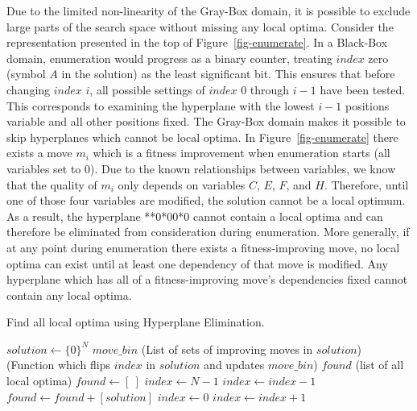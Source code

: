 \documentclass[runningheads,a4paper]{llncs}
\begin{document}
Due to the limited non-linearity of the Gray-Box domain, it is possible to exclude large
parts of the search space without missing any local optima.
Consider the representation presented in the top of Figure~\ref{fig-enumerate}. In a Black-Box
domain, enumeration would progress as a binary counter, treating $index$ zero (symbol $A$ in the solution) as
the least significant bit. This ensures that before changing $index$ $i$, all possible settings of $index$
0 through $i-1$ have been tested. This corresponds to examining the hyperplane with the lowest $i-1$ positions
variable and all other positions fixed. The Gray-Box domain makes it possible to skip hyperplanes
which cannot be local optima. In Figure~\ref{fig-enumerate} there exists a move $m_i$ which is a fitness improvement
when enumeration starts (all variables set to 0). Due to the known relationships between variables,
we know that the quality of $m_i$ only depends on variables $C$, $E$, $F$, and $H$.
Therefore, until one of those four variables are modified, the solution cannot be a local optimum.
As a result, the hyperplane **0*00*0 cannot contain a local optima and can
therefore be eliminated from consideration during enumeration.
More generally, if at any point during enumeration
there exists a fitness-improving move, no local optima can exist until at least one
dependency of that move is modified. Any hyperplane which has all of a fitness-improving
move's dependencies fixed cannot contain any local optima.

\begin{algorithm}
  \caption{Find all local optima using Hyperplane Elimination.}
  \label{alg-enumerate}
  \begin{algorithmic}[1]
    \Require $solution \leftarrow \{0\}^N$
    \Require $move\_bin$ (List of sets of improving moves in $solution$)
    \Require {} (Function which flips $index$ in $solution$ and updates $move\_bin$)
    \Ensure $found$ (list of all local optima)
    \State $found \leftarrow [~]$
    \State $index \leftarrow N-1$
      \label{alg-enumerate-bincheck}
        \State $index \leftarrow index-1$
      \EndWhile
        \State $found \leftarrow found + [solution]$
        \State $index \leftarrow 0$
      \EndIf
      \label{alg-enumerate-counter}
        \State {}
        \State $index \leftarrow index + 1$
      \EndWhile
        \State {}\label{alg-enumerate-insert}
      \EndIf
    \EndWhile
  \end{algorithmic}
\end{algorithm}
\end{document}
